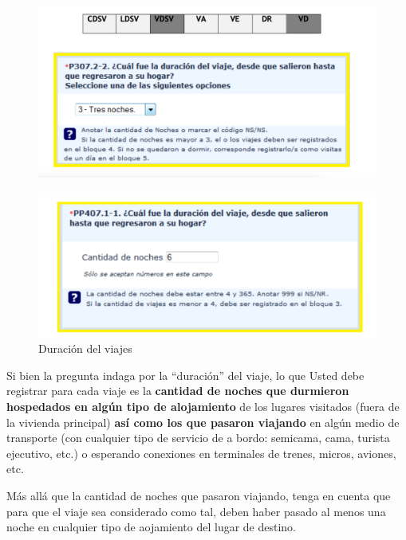 \documentclass[
  openany]{book}
\begin{document}
\begin{figure}

{\centering \includegraphics[width=1\linewidth]{imagenes/figura6-94} 

}

\end{figure}

\begin{figure}

{\centering \includegraphics[width=1\linewidth]{imagenes/figura6-95} 

}

\caption{Duración del viajes}\label{fig:dur72}
\end{figure}

Si bien la pregunta indaga por la ``duración'' del viaje, lo que Usted debe registrar para cada viaje es la \textbf{cantidad de noches que durmieron hospedados en algún tipo de alojamiento} de los lugares visitados (fuera de la vivienda principal) \textbf{así como los que pasaron viajando} en algún medio de transporte (con cualquier tipo de servicio de a bordo: semicama, cama, turista ejecutivo, etc.) o esperando conexiones en terminales de trenes, micros, aviones, etc.

Más allá que la cantidad de noches que pasaron viajando, tenga en cuenta que para que el viaje sea considerado como tal, deben haber pasado al menos una noche en cualquier tipo de aojamiento del lugar de destino.
\end{document}
